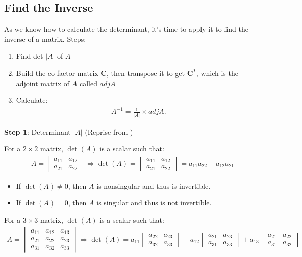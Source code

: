 \documentclass[10pt,a4paper]{book}
\theoremstyle{definition}\newtheorem{definition}{Definition}
\theoremstyle{definition}\newtheorem{fact}{Fact}
\theoremstyle{definition}\newtheorem{ex}{Ex.}
\theoremstyle{definition}\newtheorem{project}{Project}
\theoremstyle{definition}\newtheorem{problem}{Problem}
\theoremstyle{definition}\newtheorem{example}{Example}
\numberwithin{theorem}{chapter}
\numberwithin{corollary}{chapter}
\numberwithin{assumption}{chapter}
\numberwithin{definition}{chapter}
\numberwithin{prop}{chapter}
\numberwithin{notation}{chapter}
\numberwithin{problem}{chapter}
\numberwithin{example}{chapter}
\numberwithin{fact}{chapter}
\numberwithin{ex}{chapter}
\def\C{\mathbf C}
\begin{document}
	\subsection{Find the Inverse}
	As we know how to calculate the determinant, it's time to apply it to find the inverse of a matrix. Steps:
	\begin{enumerate}
		\item Find det $|A|$ of $A$
		\item Build the co-factor matrix $\C$, then transpose it to get $\C^T$, which is the adjoint matrix of $A$ called $adj A$
		\item Calculate: 
		\begin{align} 
			A^{-1} = \frac{1}{|A|} \times adj A. 
		\end{align}
	\end{enumerate}
	
	
	\textbf{Step 1}: Determinant $|A|$ (Reprise from \citet{chiang1984fundamental})
	
	For a $2 \times 2 $ matrix, $\det(A)$ is a scalar such that:
	\begin{align*}
		A = \begin{bmatrix}
			a_{11} & a_{12} \\
			a_{21} & a_{22} 
		\end{bmatrix} 
		\Rightarrow \det(A) =
		\begin{vmatrix}
			a_{11} & a_{12} \\
			a_{21} & a_{22} 
		\end{vmatrix}
		= a_{11}a_{22} - a_{12}a_{21}
	\end{align*}
	
	\begin{itemize}
		\item If $\det(A) \neq 0$, then $A$ is nonsingular and thus is invertible.
		\item If $\det(A) = 0$, then $A$ is singular and thus is not invertible.
	\end{itemize}
	
	For a $3 \times 3 $ matrix, $\det(A)$ is a scalar such that:
	\begin{align*}
		A = \begin{vmatrix}
			a_{11} & a_{12} & a_{13} \\
			a_{21} & a_{22} & a_{23} \\
			a_{31} & a_{32} & a_{33} 
		\end{vmatrix}
		\Rightarrow \det(A) = a_{11}
		\begin{vmatrix}
			a_{22} & a_{23} \\
			a_{32} & a_{33}
		\end{vmatrix}
		- a_{12}
		\begin{vmatrix}
			a_{21} & a_{23} \\
			a_{31} & a_{33}
		\end{vmatrix}
		+ a_{13}
		\begin{vmatrix}
			a_{21} & a_{22} \\
			a_{31} & a_{32}
		\end{vmatrix}
	\end{align*}
	
\end{document}
